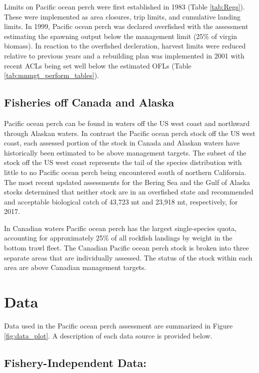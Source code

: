 \documentclass[12pt,]{article}
\begin{document}
Limits on Pacific ocean perch were first established in 1983 (Table
\ref{tab:Regs}). These were implemented as area closures, trip limits,
and cumulative landing limits. In 1999, Pacific ocean perch was declared
overfished with the assessment estimating the spawning output below the
management limit (25\% of virgin biomass). In reaction to the overfished
decleration, harvest limits were reduced relative to previous years and
a rebuilding plan was implemented in 2001 with recent ACLs being set
well below the estimated OFLs (Table \ref{tab:mnmgt_perform_tables}).

\subsection{Fisheries off Canada and
Alaska}\label{fisheries-off-canada-and-alaska}

Pacific ocean perch can be found in waters off the US west coast and
northward through Alaskan waters. In contrast the Pacific ocean perch
stock off the US west coast, each assessed portion of the stock in
Canada and Alaskan waters have historically been estimated to be above
management targets. The subset of the stock off the US west coast
represents the tail of the species distribution with little to no
Pacific ocean perch being encountered south of northern California. The
most recent updated assessments for the Bering Sea and the Gulf of
Alaska stocks determined that neither stock are in an overfished state
and recommended and acceptable biological catch of 43,723 mt and 23,918
mt, respectively, for 2017.

In Canadian waters Pacific ocean perch has the largest single-species
quota, accounting for approximately 25\% of all rockfish landings by
weight in the bottom trawl fleet. The Canadian Pacific ocean perch stock
is broken into three separate areas that are individually assessed. The
status of the stock within each area are above Canadian management
targets.

\section{Data}\label{data}

Data used in the Pacific ocean perch assessment are summarized in Figure
\ref{fig:data_plot}. A description of each data source is provided
below.

\subsection{Fishery-Independent Data:}\label{fishery-independent-data}
\end{document}
